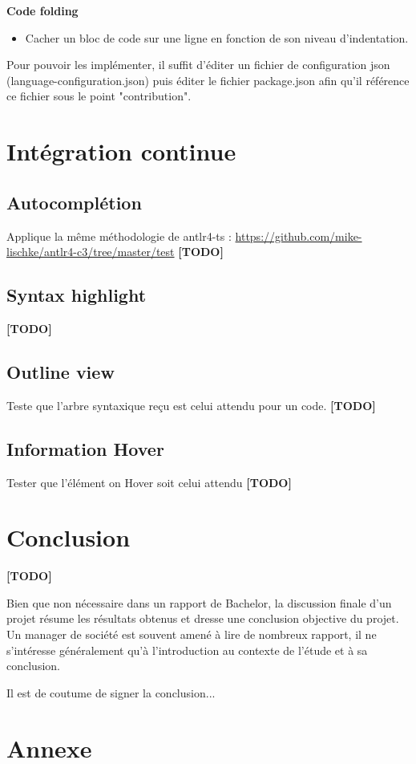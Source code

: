 \documentclass[
    iict, %
    il, %
]{heig-tb}
\begin{document}
\textbf{Code folding}
\begin{itemize}
    \item Cacher un bloc de code sur une ligne en fonction de son niveau d’indentation.
\end{itemize}

Pour pouvoir les implémenter, il suffit d’éditer un fichier de configuration json (language-configuration.json) puis  éditer le fichier package.json afin qu’il référence ce fichier sous le point "contribution".

\chapter{Intégration continue}

\section{Autocomplétion}
Applique la même méthodologie de antlr4-ts : \href{https://github.com/mike-lischke/antlr4-c3/tree/master/test}{https://github.com/mike-lischke/antlr4-c3/tree/master/test}
\textbf{[TODO]}

\section{Syntax highlight}
\textbf{[TODO]}

\section{Outline view}
Teste que l’arbre syntaxique reçu est celui attendu pour un code.
\textbf{[TODO]}

\section{Information Hover}
Tester que l’élément on Hover soit celui attendu
\textbf{[TODO]}

\chapter{Conclusion}
\textbf{[TODO]}

Bien que non nécessaire dans un rapport de Bachelor, la discussion finale d'un projet résume les résultats obtenus et dresse une conclusion objective du projet. Un manager de société est souvent amené à lire de nombreux rapport, il ne s'intéresse généralement qu'à l'introduction au contexte de l'étude et à sa conclusion.

Il est de coutume de signer la conclusion...

\vfil
\hspace{8cm}\makeatletter\@author\makeatother\par
\hspace{8cm}\begin{minipage}{5cm}
    \printsignature
\end{minipage}
\clearpage


\chapter{Annexe}
\end{document}
